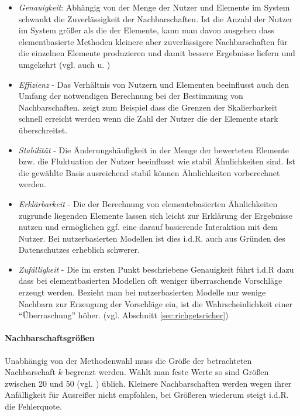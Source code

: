 \begin{itemize}
\item \textit{Genauigkeit}: Abhängig von der Menge der Nutzer und Elemente im System schwankt die Zuverlässigkeit der Nachbarschaften. Ist die Anzahl der Nutzer im System größer als die der Elemente, kann man davon ausgehen dass elementbasierte Methoden kleinere aber zuverlässigere Nachbarschaften für die einzelnen Elemente produzieren und damit bessere Ergebnisse liefern und umgekehrt (vgl. auch \citep{Huete:2012:UPA:2206442.2206675} u. \citep{Herlocker:2002:EAD:593967.594047}) 
\item \textit{Effizienz} - Das Verhältnis von Nutzern und Elementen beeinflusst auch den Umfang der notwendigen Berechnung bei der Bestimmung von Nachbarschaften. \citep{linden03} zeigt zum Beispiel dass die Grenzen der Skalierbarkeit schnell erreicht werden wenn die Zahl der Nutzer die der Elemente stark überschreitet.
\item \textit{Stabilität} - Die Änderungshäufigkeit in der Menge der bewerteten Elemente bzw. die Fluktuation der Nutzer beeinflusst wie stabil Ähnlichkeiten sind. Ist die gewählte Basis ausreichend stabil können Ähnlichkeiten vorberechnet werden. 
\item \textit{Erklärbarkeit} - Die der Berechnung von elementebasierten Ähnlichkeiten zugrunde liegenden Elemente lassen sich leicht zur Erklärung der Ergebnisse nutzen und ermöglichen ggf. eine darauf basierende Interaktion mit dem Nutzer. Bei nutzerbasierten Modellen ist dies i.d.R. auch aus Gründen des Datenschutzes erheblich schwerer.
\item \textit{Zufälligkeit} - Die im ersten Punkt beschriebene Genauigkeit führt i.d.R dazu dass bei elementbasierten Modellen oft weniger überraschende Vorschläge erzeugt werden. Bezieht man bei nutzerbasierten Modelle nur wenige Nachbarn zur Erzeugung der Vorschläge ein, ist die Wahrscheinlichkeit einer ``Überraschung'' höher. (vgl. Abschnitt \ref{sec:richgetsricher})
\end{itemize}

\paragraph{Nachbarschaftsgrößen} Unabhängig von der Methodenwahl muss die Größe der betrachteten Nachbarschaft $k$ begrenzt werden. Wählt man feste Werte so sind Größen zwischen 20 und 50 (vgl. \citep{Herlocker:2002:EAD:593967.594047}) üblich. Kleinere Nachbarschaften werden wegen ihrer Anfälligkeit für Ausreißer nicht empfohlen, bei Größeren wiederum steigt i.d.R. die Fehlerquote. 

